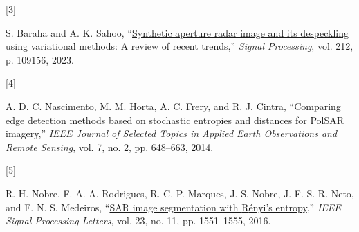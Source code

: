 \documentclass[
  lettersize  journal,
]{IEEEtran}%
\newlength{\cslhangindent}
\newlength{\csllabelwidth}
\newenvironment{CSLReferences}[2] %
 {\begin{list}{}{%
  \setlength{\itemindent}{0pt}
  \setlength{\leftmargin}{0pt}
  \setlength{\parsep}{0pt}
  \ifodd #1
   \setlength{\leftmargin}{\cslhangindent}
   \setlength{\itemindent}{-1\cslhangindent}
  \fi
  \setlength{\itemsep}{#2\baselineskip}}}
 {\end{list}}
\newcommand{\CSLLeftMargin}[1]{\parbox[t]{\csllabelwidth}{\strut#1\strut}}
\newcommand{\CSLRightInline}[1]{\parbox[t]{\linewidth - \csllabelwidth}{\strut#1\strut}}
\providecommand{\DIFaddbegin}{} %
\providecommand{\DIFaddend}{} %
\providecommand{\DIFdelbegin}{} %
\providecommand{\DIFdelend}{} %
\newcommand{\DIFscaledelfig}{0.5}
\newlength{\DIFdelgraphicswidth} %
\newlength{\DIFdelgraphicsheight} %
\newcommand{\DIFaddincludegraphics}[2][]{{\color{blue}\fbox{\DIFOincludegraphics[#1]{#2}}}} %
\newcommand{\DIFdelincludegraphics}[2][]{%
\sbox{\DIFdelgraphicsbox}{\DIFOincludegraphics[#1]{#2}}%
\settoboxwidth{\DIFdelgraphicswidth}{\DIFdelgraphicsbox} %
\settoboxtotalheight{\DIFdelgraphicsheight}{\DIFdelgraphicsbox} %
\scalebox{\DIFscaledelfig}{%
\parbox[b]{\DIFdelgraphicswidth}{\usebox{\DIFdelgraphicsbox}\\[-\baselineskip] \rule{\DIFdelgraphicswidth}{0em}}\llap{\resizebox{\DIFdelgraphicswidth}{\DIFdelgraphicsheight}{%
\setlength{\unitlength}{\DIFdelgraphicswidth}%
\begin{picture}(1,1)%
\thicklines\linethickness{2pt} %
{\color[rgb]{1,0,0}\put(0,0){\framebox(1,1){}}}%
{\color[rgb]{1,0,0}\put(0,0){\line( 1,1){1}}}%
{\color[rgb]{1,0,0}\put(0,1){\line(1,-1){1}}}%
\end{picture}%
}\hspace*{3pt}}} %
} %
\DeclareRobustCommand{\DIFaddbegin}{\DIFOaddbegin \let\includegraphics\DIFaddincludegraphics} %
\DeclareRobustCommand{\DIFaddend}{\DIFOaddend \let\includegraphics\DIFOincludegraphics} %
\DeclareRobustCommand{\DIFdelbegin}{\DIFOdelbegin \let\includegraphics\DIFdelincludegraphics} %
\DeclareRobustCommand{\DIFdelend}{\DIFOaddend \let\includegraphics\DIFOincludegraphics} %
\begin{document}
\begin{CSLReferences}{0}{0}
\DIFdelbegin {}
\DIFdelend \DIFaddbegin {}
\DIFaddend \CSLLeftMargin{{[}3{]} }%
\DIFdelbegin %
\DIFdelend \DIFaddbegin \CSLRightInline{S. Baraha and A. K. Sahoo,
{``\href{https://doi.org/10.1016/j.sigpro.2023.109156}{Synthetic
aperture radar image and its despeckling using variational methods: A
review of recent trends},''} \emph{Signal Processing}, vol. 212, p.
109156, 2023. }
\DIFaddend 

\DIFdelbegin {}
\DIFdelend \DIFaddbegin {}
\DIFaddend \CSLLeftMargin{{[}4{]} }%
\DIFdelbegin %
\DIFdelend \DIFaddbegin \CSLRightInline{A. D. C. Nascimento, M. M. Horta, A. C. Frery, and R. J.
Cintra, {``Comparing edge detection methods based on stochastic
entropies and distances for {PolSAR} imagery,''} \emph{{IEEE} Journal of
Selected Topics in Applied Earth Observations and Remote Sensing}, vol.
7, no. 2, pp. 648--663, 2014. }
\DIFaddend 

\DIFdelbegin {}
\DIFdelend \DIFaddbegin {}
\DIFaddend \CSLLeftMargin{{[}5{]} }%
\DIFdelbegin %
\DIFdelend \DIFaddbegin \CSLRightInline{R. H. Nobre, F. A. A. Rodrigues, R. C. P. Marques, J. S.
Nobre, J. F. S. R. Neto, and F. N. S. Medeiros,
{``\href{https://doi.org/10.1109/lsp.2016.2606760}{SAR image
segmentation with {R}ényi's entropy},''} \emph{IEEE Signal Processing
Letters}, vol. 23, no. 11, pp. 1551--1555, 2016. }
\DIFaddend 


\end{CSLReferences}
\end{document}
